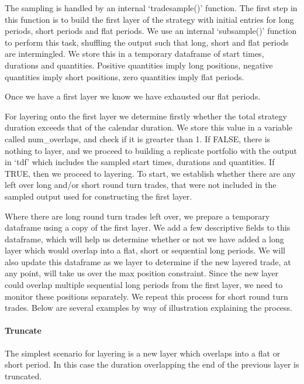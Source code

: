 The sampling is handled by an internal `tradesample()' function. The
first step in this function is to build the first layer of the strategy
with initial entries for long periods, short periods and flat periods.
We use an internal `subsample()' function to perform this task,
shuffling the output such that long, short and flat periods are
intermingled. We store this in a temporary dataframe of start times,
durations and quantities. Positive quantities imply long positions,
negative quantities imply short positions, zero quantities imply flat
periods.

Once we have a first layer we know we have exhausted our flat periods.

For layering onto the first layer we determine firstly whether the total
strategy duration exceeds that of the calendar duration. We store this
value in a variable called num\_overlaps, and check if it is grearter
than 1. If FALSE, there is nothing to layer, and we proceed to building
a replicate portfolio with the output in `tdf' which includes the
sampled start times, durations and quantities. If TRUE, then we proceed
to layering. To start, we establish whether there are any left over long
and/or short round turn trades, that were not included in the sampled
output used for constructing the first layer.

Where there are long round turn trades left over, we prepare a temporary
dataframe using a copy of the first layer. We add a few descriptive
fields to this dataframe, which will help us determine whether or not we
have added a long layer which would overlap into a flat, short or
sequential long periods. We will also update this dataframe as we layer
to determine if the new layered trade, at any point, will take us over
the max position constraint. Since the new layer could overlap multiple
sequential long periods from the first layer, we need to monitor these
positions separately. We repeat this process for short round turn
trades. Below are several examples by way of illustration explaining the
process.

\hypertarget{truncate}{%
\paragraph{Truncate}\label{truncate}}

The simplest scenario for layering is a new layer which overlaps into a
flat or short period. In this case the duration overlapping the end of
the previous layer is truncated.

